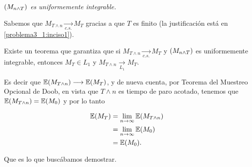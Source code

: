 \emph{
    $\left( M_{n\wedge T}\right) $ es uniformemente integrable. 
}

\afterstatement\pn

Sabemos que $M_{T \wedge n} \underset{c.s.}\longrightarrow M_T$ gracias a que $T$ es finito 
(la justificación está en \ref{problema3_1:inciso1}).\pn

Existe un teorema que garantiza que si $M_{T \wedge n} \underset{c.s.}\longrightarrow M_T$ y 
$\left( M_{n\wedge T}\right) $ es uniformemente integrable, entonces 
$M_T \in L_1$ y $M_{T \wedge n} \underset{L_1}\longrightarrow M_T$.\pn

Es decir que $\mathbb{E}(M_{T \wedge n}) \longrightarrow \mathbb{E}(M_T)$, y de nueva cuenta, por Teorema del Muestreo Opcional de Doob, 
en vista que $T \wedge n$ es tiempo de paro acotado, tenemos que $\mathbb{E}(M_{T \wedge n}) = \mathbb{E}(M_0)$ y por lo tanto

\begin{align}
    \mathbb{E}(M_T)     &=  \lim_{n \rightarrow \infty} \mathbb{E}(M_{T \wedge n})      \\
                &=  \lim_{n \rightarrow \infty} \mathbb{E}(M_0)                 \\
                &=  \mathbb{E}(M_0).
\end{align}\pn

Que es lo que buscábamos demostrar.
